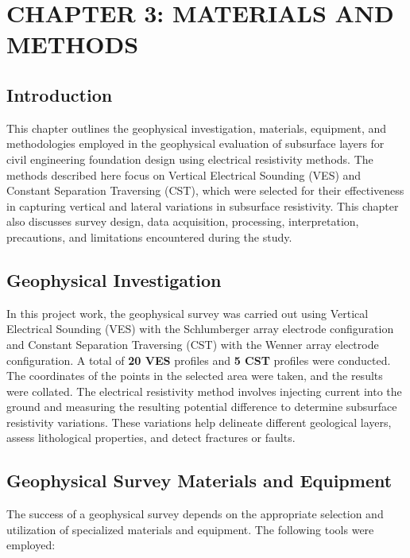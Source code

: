 \documentclass[12pt,a4paper]{report}
\begin{document}
\chapter{CHAPTER 3: MATERIALS AND METHODS}

\section{Introduction}
This chapter outlines the geophysical investigation, materials, equipment, and methodologies employed in the geophysical evaluation of subsurface layers for civil engineering foundation design using electrical resistivity methods. The methods described here focus on Vertical Electrical Sounding (VES) and Constant Separation Traversing (CST), which were selected for their effectiveness in capturing vertical and lateral variations in subsurface resistivity. This chapter also discusses survey design, data acquisition, processing, interpretation, precautions, and limitations encountered during the study.

\section{Geophysical Investigation}
In this project work, the geophysical survey was carried out using Vertical Electrical Sounding (VES) with the Schlumberger array electrode configuration and Constant Separation Traversing (CST) with the Wenner array electrode configuration. A total of \textbf{20 VES} profiles and \textbf{5 CST} profiles were conducted. The coordinates of the points in the selected area were taken, and the results were collated. The electrical resistivity method involves injecting current into the ground and measuring the resulting potential difference to determine subsurface resistivity variations. These variations help delineate different geological layers, assess lithological properties, and detect fractures or faults.

\section{Geophysical Survey Materials and Equipment}
The success of a geophysical survey depends on the appropriate selection and utilization of specialized materials and equipment. The following tools were employed:
\end{document}
